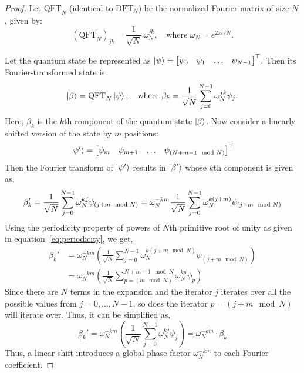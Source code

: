 \begin{proof}
    Let \( \text{QFT}_N \) (identical to \( \text{DFT}_N \)) be the normalized Fourier matrix of size \( N \), given by:
\begin{equation}
    (\text{QFT}_N)_{jk} = \frac{1}{\sqrt{N}} \, \omega_N^{jk}, \quad \text{where } \omega_N = e^{2\pi\iota / N}.
\end{equation}

Let the quantum state be represented as \( \ket{\psi} = \begin{bmatrix}
    \psi_0 &\psi_1 & \ldots & \psi_{N-1} 
\end{bmatrix}^\top\). Then its Fourier-transformed state is:
\begin{equation}
    \ket{\beta} = \text{QFT}_N \ket{\psi}, \quad \text{where } \beta_k = \frac{1}{\sqrt{N}} \sum_{j=0}^{N-1} \omega_N^{jk} \psi_j.
\end{equation}
Here, $\beta_k$ is the $k$th component of the quantum state $\ket{\beta}$.
Now consider a linearly shifted version of the state by \( m \) positions:
\[
    \ket{\psi'} = \begin{bmatrix}
        \psi_m & \psi_{m+1} & \ldots & \psi_{(N+m-1 \mod N)}
    \end{bmatrix}^\top
\]
Then the Fourier transform of \( \ket{\psi'} \) results in \(\ket{\beta'}\) whose $k$th component is given as,
\begin{equation}
    \beta_k' = \frac{1}{\sqrt{N}} \sum_{j=0}^{N-1} \omega_N^{kj} \psi_{(j+m \mod N)} = \omega_N^{-km} \frac{1}{\sqrt{N}} \sum_{j=0}^{N-1} \omega_N^{k(j+m)} \psi_{(j+m \mod N)}\\
\end{equation}
Using the periodicity property of powers of $N$th primitive root of unity as given in equation~\eqref{eq:periodicity}, we get, 
\begin{align*}
    \beta_k' &= \omega_N^{-km} \left(\frac{1}{\sqrt{N}} \sum_{j=0}^{N-1} \omega_N^{k(j+m \mod N)} \psi_{(j+m \mod N)}\right)\\
    &=\omega_N^{-km}\left(\frac{1}{\sqrt{N}}\sum_{p = (m \mod N)}^{N+m-1\mod N}\omega_N^{kp}\psi_{p}\right)
\end{align*}
Since there are $N$ terms in the expansion and the iterator $j$ iterates over all the possible values from $j=0,\ldots,N-1$, so does the iterator $p = (j+m \mod N)$ will iterate over. Thus, it can be simplified as,
\begin{equation}
    \beta_k' = \omega_N^{-km}\left( \frac{1}{\sqrt{N}} \sum_{j=0}^{N-1} \omega_N^{kj}\psi_{j}\right) = \omega_N^{-km}\cdot \beta_k
\end{equation}
Thus, a linear shift introduces a global phase factor \( \omega_N^{-km} \) to each Fourier coefficient. 
\end{proof}
